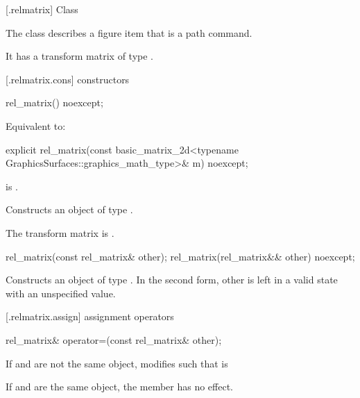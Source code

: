 [\iotwod.relmatrix] {Class }%

\pnum
{}%
The class  describes a figure item that is a path command.

\pnum
It has a transform matrix of type .

 [\iotwod.relmatrix.cons] { constructors}

%
\begin{itemdecl}
rel_matrix() noexcept;
\end{itemdecl}
\begin{itemdescr}
\pnum
\effects
Equivalent to: 
\end{itemdescr}

%
\begin{itemdecl}
explicit rel_matrix(const basic_matrix_2d<typename
  GraphicsSurfaces::graphics_math_type>& m) noexcept;
\end{itemdecl}
\begin{itemdescr}
\pnum
\requires
{} is .

\pnum
\effects
Constructs an object of type .

\pnum
The transform matrix is .
\end{itemdescr}

%
\begin{itemdecl}
rel_matrix(const rel_matrix& other);
rel_matrix(rel_matrix&& other) noexcept;
\end{itemdecl}
\begin{itemdescr}
\pnum
\effects
Constructs an object of type . In the second form, other is left in a valid state with an unspecified value.
\end{itemdescr}

 [\iotwod.relmatrix.assign] { assignment operators}

%
\begin{itemdecl}
rel_matrix& operator=(const rel_matrix& other);
\end{itemdecl}
\begin{itemdescr}
\pnum
\effects
If  and  are not the same object, modifies  such that  is 

\pnum
If  and  are the same object, the member has no effect.

\pnum
\returns
{}
\end{itemdescr}

